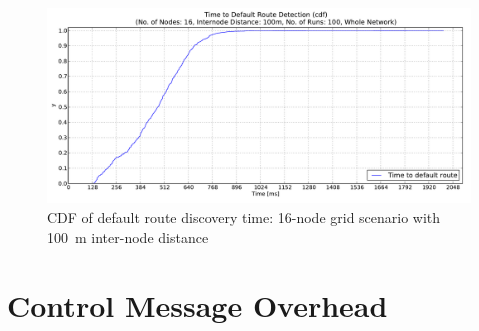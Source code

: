 \begin{figure}[htpb]
  \begin{center}
   \vspace{-20pt}
    \leavevmode
      \includegraphics[scale=0.38]
      {Pics/results/16/MRHOF/grid/dist100_montecarlo_cdf_hist.pdf}
   \caption{CDF of default route discovery time: 16-node grid scenario with 100~m inter-node distance}
   \end{center}
\end{figure}

\clearpage
\section{Control Message Overhead}
\label{Appx:icmp}

